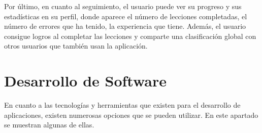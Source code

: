 Por último, en cuanto al seguimiento, el usuario puede ver su progreso y sus estadísticas en su perfil, donde aparece el número de lecciones
completadas, el número de errores que ha tenido, la experiencia que tiene. Además, el usuario consigue logros al completar las lecciones y 
comparte una clasificación global con otros usuarios que también usan la aplicación.


\begin{figure}[H]
    \centering
    \hspace{3em}
\end{figure}

\newpage



\section{Desarrollo de Software}
En cuanto a las tecnologías y herramientas que existen para el desarrollo de aplicaciones, 
existen numerosas opciones que se pueden utilizar. En este apartado se muestran algunas de ellas.

